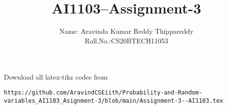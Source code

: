 \documentclass[journal,12pt,twocolumn]{IEEEtran}
\DeclareMathOperator*{\Res}{Res}
\begin{document}
\newcommand{\BEQA}{\begin{eqnarray}}
\newcommand{\EEQA}{\end{eqnarray}}
\newcommand{\define}{\stackrel{\triangle}{=}}

\raggedbottom
\setlength{\parindent}{0pt}
\providecommand{\mbf}{\mathbf}
\providecommand{\pr}[1]{\ensuremath{\Pr\left(#1\right)}}
\providecommand{\qfunc}[1]{\ensuremath{Q\left(#1\right)}}
\providecommand{\sbrak}[1]{\ensuremath{{}\left[#1\right]}}
\providecommand{\lsbrak}[1]{\ensuremath{{}\left[#1\right.}}
\providecommand{\rsbrak}[1]{\ensuremath{{}\left.#1\right]}}
\providecommand{\brak}[1]{\ensuremath{\left(#1\right)}}
\providecommand{\lbrak}[1]{\ensuremath{\left(#1\right.}}
\providecommand{\rbrak}[1]{\ensuremath{\left.#1\right)}}
\providecommand{\cbrak}[1]{\ensuremath{\left\{#1\right\}}}
\providecommand{\lcbrak}[1]{\ensuremath{\left\{#1\right.}}
\providecommand{\rcbrak}[1]{\ensuremath{\left.#1\right\}}}
\theoremstyle{remark}
\newtheorem{rem}{Remark}
\newcommand{\sgn}{\mathop{\mathrm{sgn}}}
\providecommand{\abs}[1]{\vert#1\vert}
\providecommand{\res}[1]{\Res\displaylimits_{#1}} 
\providecommand{\norm}[1]{\lVert#1\rVert}
\providecommand{\mtx}[1]{\mathbf{#1}}
\providecommand{\mean}[1]{E[ #1 ]}
\providecommand{\fourier}{\overset{\mathcal{F}}{ \rightleftharpoons}}
\providecommand{\system}{\overset{\mathcal{H}}{ \longleftrightarrow}}
\newcommand{\solution}{\noindent \textbf{Solution: }}
\newcommand{\cosec}{\,\text{cosec}\,}
\providecommand{\dec}[2]{\ensuremath{\overset{#1}{\underset{#2}{\gtrless}}}}
\newcommand{\myvec}[1]{\ensuremath{\begin{pmatrix}#1\end{pmatrix}}}
\newcommand{\mydet}[1]{\ensuremath{\begin{vmatrix}#1\end{vmatrix}}}
\makeatletter
{}
\makeatother
\let\StandardTheFigure\thefigure
\let\vec\mathbf
\renewcommand{\thefigure}{\theproblem}
\def\putbox#1#2#3{\makebox[0in][l]{\makebox[#1][l]{}\raisebox{\baselineskip}[0in][0in]{\raisebox{#2}[0in][0in]{#3}}}}
     \def\rightbox#1{\makebox[0in][r]{#1}}
     \def\centbox#1{\makebox[0in]{#1}}
     \def\topbox#1{\raisebox{-\baselineskip}[0in][0in]{#1}}
     \def\midbox#1{\raisebox{-0.5\baselineskip}[0in][0in]{#1}}
\vspace{3cm}
\title{AI1103--Assignment-3}
\author{Name: Aravinda Kumar Reddy Thippareddy\\Roll.No.:CS20BTECH11053}
\maketitle
\newpage
\bigskip
\renewcommand{\thefigure}{\theenumi}
\renewcommand{\thetable}{\theenumi}
Download all latex-tikz codes from
%
\begin{lstlisting}
https://github.com/AravindCSEiith/Probability-and-Random-variables_AI1103_Asignment-3/blob/main/Assignment-3--AI1103.tex
\end{lstlisting}
\end{document}
